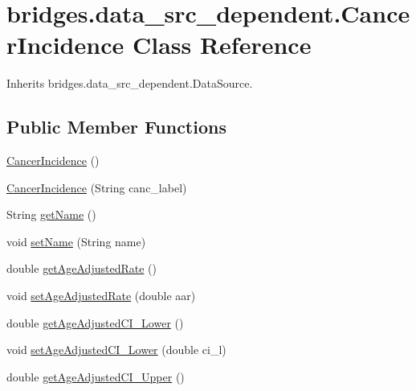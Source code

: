 \hypertarget{classbridges_1_1data__src__dependent_1_1_cancer_incidence}{}\section{bridges.\+data\+\_\+src\+\_\+dependent.\+Cancer\+Incidence Class Reference}
\label{classbridges_1_1data__src__dependent_1_1_cancer_incidence}


Inherits bridges.\+data\+\_\+src\+\_\+dependent.\+Data\+Source.

\subsection*{Public Member Functions}
\begin{DoxyCompactItemize}
\item 
\mbox{\hyperlink{classbridges_1_1data__src__dependent_1_1_cancer_incidence_a92db1eb4292c77f07619019587caf5cc}{Cancer\+Incidence}} ()
\item 
\mbox{\hyperlink{classbridges_1_1data__src__dependent_1_1_cancer_incidence_a3db553c2769892563c3f1ebb033ba4c6}{Cancer\+Incidence}} (String canc\+\_\+label)
\item 
String \mbox{\hyperlink{classbridges_1_1data__src__dependent_1_1_cancer_incidence_ac7958f37807979cf06e712373f080b9a}{get\+Name}} ()
\item 
void \mbox{\hyperlink{classbridges_1_1data__src__dependent_1_1_cancer_incidence_a1aef58b128adfd1e2a31ab9726247e9e}{set\+Name}} (String name)
\item 
double \mbox{\hyperlink{classbridges_1_1data__src__dependent_1_1_cancer_incidence_a87bc1cbc5a72eb9b4df5ff7ab4843ae8}{get\+Age\+Adjusted\+Rate}} ()
\item 
void \mbox{\hyperlink{classbridges_1_1data__src__dependent_1_1_cancer_incidence_a26c2d63e8465bcfdab047129312b4897}{set\+Age\+Adjusted\+Rate}} (double aar)
\item 
double \mbox{\hyperlink{classbridges_1_1data__src__dependent_1_1_cancer_incidence_a7e5dab6d140f2a8e162c5d5c514c74c1}{get\+Age\+Adjusted\+C\+I\+\_\+\+Lower}} ()
\item 
void \mbox{\hyperlink{classbridges_1_1data__src__dependent_1_1_cancer_incidence_a4cd8ce7c68f00d2cd15928764cc32c09}{set\+Age\+Adjusted\+C\+I\+\_\+\+Lower}} (double ci\+\_\+l)
\item 
double \mbox{\hyperlink{classbridges_1_1data__src__dependent_1_1_cancer_incidence_ae7b71d91c3acae9fce3536f6a9d8362b}{get\+Age\+Adjusted\+C\+I\+\_\+\+Upper}} ()

\end{DoxyCompactItemize}
